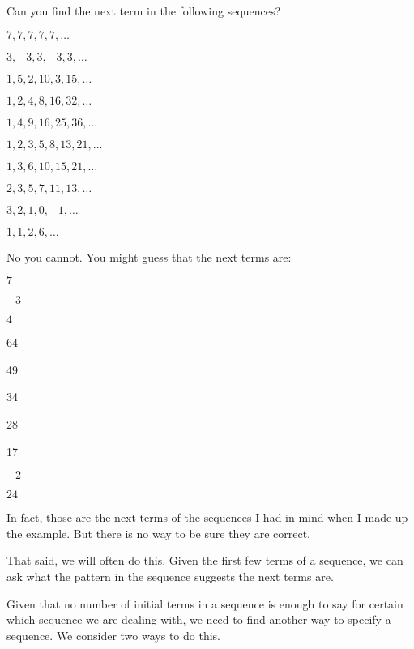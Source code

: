\documentclass[12pt]{article}
\begin{document}
\begin{example}
Can you find the next term in the following sequences?
\begin{enumerate}


\begin{multicols}{2}
		\item $7,7,7,7,7, \ldots$
		\item $3, -3, 3, -3, 3, \ldots$
		\item $1, 5, 2, 10, 3, 15, \ldots$
		\item $1, 2, 4, 8, 16, 32, \ldots$
		\item $1, 4, 9, 16, 25, 36, \ldots$
		\item $1, 2, 3, 5, 8, 13, 21, \ldots$
		\item $1, 3, 6, 10, 15, 21, \ldots$
		\item $2, 3, 5, 7, 11, 13, \ldots$
		\item $3, 2, 1, 0, -1, \ldots$
		\item $1, 1, 2, 6, \ldots$ 
		\end{multicols}
	\end{enumerate}
	\begin{solution}
	 No you cannot.  You might guess that the next terms are: 
	 \begin{enumerate}
	  \begin{multicols}{4}
	  \item $7$
	  \item $-3$
	  		\item $4$
		\item 64
		\item 49
		\item 34
		\item 28
		\item 17
		\item $-2$
		\item $24$
	  \end{multicols}

	 \end{enumerate}
	 In fact, those are the next terms of the sequences I had in mind when I made up the example.  But there is no way to be sure they are correct.  
	 
	 That said, we will often do this.  Given the first few terms of a sequence, we can ask what the pattern in the sequence suggests the next terms are.  
	\end{solution}

\end{example}

Given that no number of initial terms in a sequence is enough to say for certain which sequence we are dealing with, we need to find another way to specify a sequence.  We consider two ways to do this.
\end{document}
